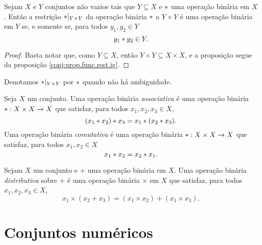 \begin{proposition}
\label{prop:restri.op.bin}
Sejam $X$ e $Y$ conjuntos não vazios tais que $Y \subseteq X$ e $ \ast $ uma operação binária em $X$. Então a restrição $ \ast |_{Y \times Y}$ da operação binária $ \ast $ a $Y \times Y$ é uma operação binária em $Y$ se, e somente se, para todos $y_1,y_2 \in Y$
	\begin{equation*}
	y_1 \ast y_2 \in Y.
	\end{equation*}
\end{proposition}
\begin{proof}
Basta notar que, como $Y \subseteq X$, então $Y \times Y \subseteq X \times X$, e a proposição segue da proposição \ref{conj:prop.func.rest.ig}.
\end{proof}

Denotamos $\ast |_{Y \times Y}$ por $\ast$ quando não há ambiguidade.

\begin{definition}
Seja $X$ um conjunto. Uma operação binária \emph{associativa} é uma operação binária $\ast: X \times X \to X$ que satisfaz, para todos $x_1,x_2,x_3 \in X$,
	\begin{equation*}
	(x_1 \ast x_2) \ast x_3 = x_1 \ast (x_2 \ast x_3).
	\end{equation*}
Uma operação binária \emph{comutativa} é uma operação binária $\ast : X \times X \to X$ que satisfaz, para todos $x_1,x_2 \in X$
	\begin{equation*}
	x_1 \ast x_2 = x_2 \ast x_1.
	\end{equation*}
\end{definition}

\begin{definition}
	Sejam $X$ um conjunto e $+$ uma operação binária em $X$. Uma operação binária \emph{distributiva} sobre $+$ é uma operação binária $\times$ em $X$ que satisfaz, para todos $x_1,x_2,x_3 \in X$,
	\begin{equation*}
	x_1 \times (x_2 + x_3) = (x_1 \times x_2) + (x_1 \times x_3).
	\end{equation*}
\end{definition}

\section{Conjuntos numéricos}


